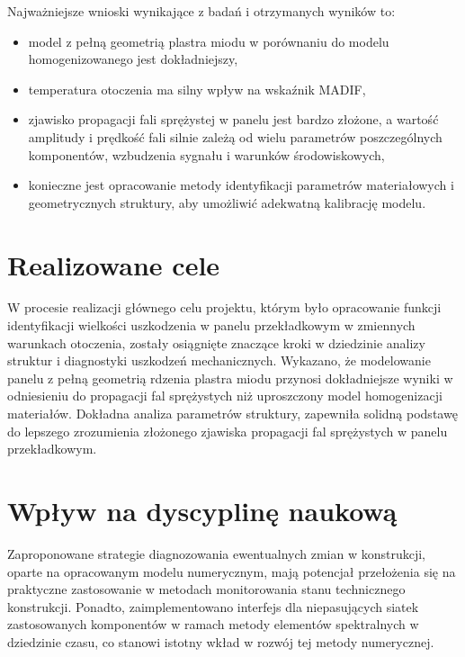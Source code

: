 \documentclass[a4paper,11pt]{article}
\begin{document}
Najważniejsze wnioski wynikające z badań i otrzymanych wyników to:
\begin{itemize}
	\item model z pełną geometrią plastra miodu w porównaniu do modelu homogenizowanego jest dokładniejszy,
	\item temperatura otoczenia ma silny wpływ na wskaźnik MADIF,
	\item zjawisko propagacji fali sprężystej w panelu jest bardzo złożone, a wartość amplitudy i prędkość fali silnie zależą od wielu parametrów poszczególnych komponentów, wzbudzenia sygnału i warunków środowiskowych,
	\item konieczne jest opracowanie metody identyfikacji parametrów materiałowych i geometrycznych struktury, aby umożliwić adekwatną kalibrację modelu.
\end{itemize}

\section{Realizowane cele}
W procesie realizacji głównego celu projektu, którym było opracowanie funkcji identyfikacji wielkości uszkodzenia w panelu przekładkowym w zmiennych warunkach otoczenia, zostały osiągnięte znaczące kroki w dziedzinie analizy struktur i diagnostyki uszkodzeń mechanicznych. Wykazano, że modelowanie panelu z pełną geometrią rdzenia plastra miodu przynosi dokładniejsze wyniki w odniesieniu do propagacji fal sprężystych niż uproszczony model homogenizacji materiałów. Dokładna analiza parametrów struktury, zapewniła solidną podstawę do lepszego zrozumienia złożonego zjawiska propagacji fal sprężystych w panelu przekładkowym.

\section{Wpływ na dyscyplinę naukową}
Zaproponowane strategie diagnozowania ewentualnych zmian w konstrukcji, oparte na opracowanym modelu numerycznym, mają potencjał przełożenia się na praktyczne zastosowanie w metodach monitorowania stanu technicznego konstrukcji.
Ponadto, zaimplementowano interfejs dla niepasujących siatek zastosowanych komponentów w ramach metody elementów spektralnych w dziedzinie czasu, co stanowi istotny wkład w rozwój tej metody numerycznej.
\end{document}
